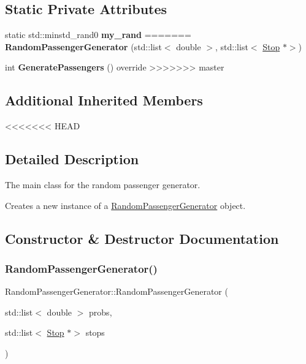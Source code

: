 \subsection*{Static Private Attributes}
\begin{DoxyCompactItemize}
\item 
\mbox{\label{classRandomPassengerGenerator_af695eeece3acf5f2e2a7f25f9c46bfbe}} 
static std\+::minstd\+\_\+rand0 {\bfseries my\+\_\+rand}
=======
\mbox{\label{classRandomPassengerGenerator_a1be1b4abfe82bfe95eb0a078d9a3342d}} 
{\bfseries Random\+Passenger\+Generator} (std\+::list$<$ double $>$, std\+::list$<$ \hyperlink{classStop}{Stop} $\ast$$>$)
\item 
\mbox{\label{classRandomPassengerGenerator_aba2d80cde33371cf9c3d033f1b8ba6b8}} 
int {\bfseries Generate\+Passengers} () override
>>>>>>> master
\end{DoxyCompactItemize}
\subsection*{Additional Inherited Members}


<<<<<<< HEAD
\subsection{Detailed Description}
The main class for the random passenger generator. 

Creates a new instance of a \hyperlink{classRandomPassengerGenerator}{Random\+Passenger\+Generator} object. 

\subsection{Constructor \& Destructor Documentation}
\mbox{\label{classRandomPassengerGenerator_a1be1b4abfe82bfe95eb0a078d9a3342d}} 
\subsubsection{\texorpdfstring{Random\+Passenger\+Generator()}{RandomPassengerGenerator()}}
{\footnotesize\ttfamily Random\+Passenger\+Generator\+::\+Random\+Passenger\+Generator (\begin{DoxyParamCaption}\item[{std\+::list$<$ double $>$}]{probs,  }\item[{std\+::list$<$ \hyperlink{classStop}{Stop} $\ast$$>$}]{stops }\end{DoxyParamCaption})}



